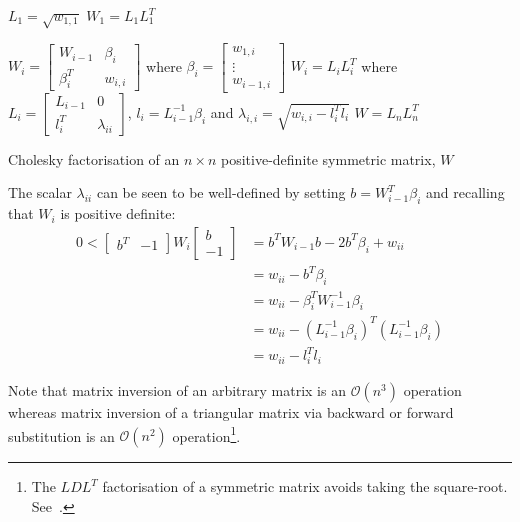 \documentclass[a4paper,twoside,10pt,english]{report}
\begin{document}
\begin{algorithm}
\begin{algorithmic}
\State $L_{1}=\sqrt{w_{1,1}}$
\State $W_{1}=L_{1}L_{1}^{T}$

  \State $W_{i} = \left[\begin{array}{cc}
W_{i-1} & \beta_{i}\\
\beta_{i}^{T} & w_{i,i}
\end{array}\right]$
where 
$\beta_{i} = \left[\begin{array}{c}
w_{1,i}\\
\vdots\\
w_{i-1,i}
\end{array}\right]$
  \State $W_{i} = L_{i}L_{i}^{T}$ where
$L_{i} = \left[\begin{array}{cc}
L_{i-1} & 0\\
l_{i}^{T} & \lambda_{ii}
\end{array}\right]$, $l_{i} = L_{i-1}^{-1}\beta_{i}$ and 
$\lambda_{i,i} = \sqrt{w_{i,i}-l_{i}^{T}l_{i}}$
\EndFor
\State $W=L_{n}L_{n}^{T}$
\end{algorithmic}
\caption{\label{alg:Cholesky-factorisation}Cholesky factorisation of an
$n\times{}n$ positive-definite symmetric matrix, $W$}
\end{algorithm}

The scalar $\lambda_{ii}$ can be seen to be well-defined by setting
$b=W_{i-1}^{T}\beta_{i}$ and recalling that $W_{i}$ is positive
definite:
\begin{align*}
0<\left[\begin{array}{cc}
b^{T} & -1\end{array}\right]W_{i}\left[\begin{array}{c}
b\\
-1
\end{array}\right] &= b^{T}W_{i-1}b-2b^{T}\beta_{i}+w_{ii}\\
 &= w_{ii}-b^{T}\beta_{i}\\
 &= w_{ii}-\beta_{i}^{T}W_{i-1}^{-1}\beta_{i}\\
 &= w_{ii}-\left(L_{i-1}^{-1}\beta_{i}\right)^{T}\left(L_{i-1}^{-1}\beta_{i}\right)\\
 &= w_{ii}-l_{i}^{T}l_{i}
\end{align*}

Note that matrix inversion of an arbitrary matrix is an 
$\mathcal{O}\left(n^{3}\right)$ operation whereas matrix inversion of a 
triangular matrix via backward or forward substitution is an 
$\mathcal{O}\left(n^{2}\right)$ operation\footnote{The $LDL^{T}$ factorisation
of a symmetric matrix avoids taking the square-root. 
See~\cite[Algorithm 4.1.2]{GolubVanLoan_MatrixComputations}.}.
\end{document}
